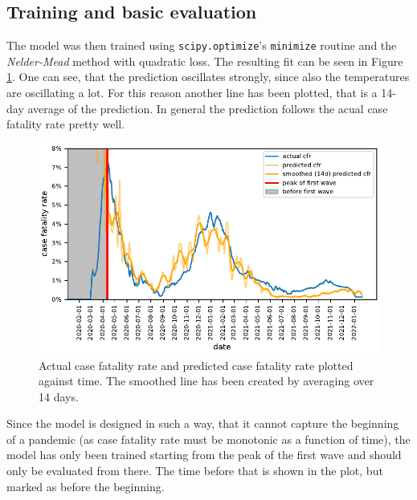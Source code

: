 \documentclass{article}
\begin{document}
\subsection{Training and basic evaluation}

The model was then trained using \texttt{scipy.optimize}'s \texttt{minimize} routine and the \textit{Nelder-Mead} method with quadratic loss. The resulting fit can be seen in Figure \ref{fig:prediction}. One can see, that the prediction oscillates strongly, since also the temperatures are oscillating a lot. For this reason another line has been plotted, that is a 14-day average of the prediction. In general the prediction follows the acual case fatality rate pretty well.

\begin{figure}[hbt!]
  \begin{center}
    \includegraphics{../fig/prediction.pdf}
    \caption{Actual case fatality rate and predicted case fatality rate plotted against time. The smoothed line has been created by averaging over 14 days.}
    \label{fig:prediction}
  \end{center}
\end{figure} 

Since the model is designed in such a way, that it cannot capture the beginning of a pandemic (as case fatality rate must be monotonic as a function of time), the model has only been trained starting from the peak of the first wave and should only be evaluated from there. The time before that is shown in the plot, but marked as before the beginning. 

\end{document}
